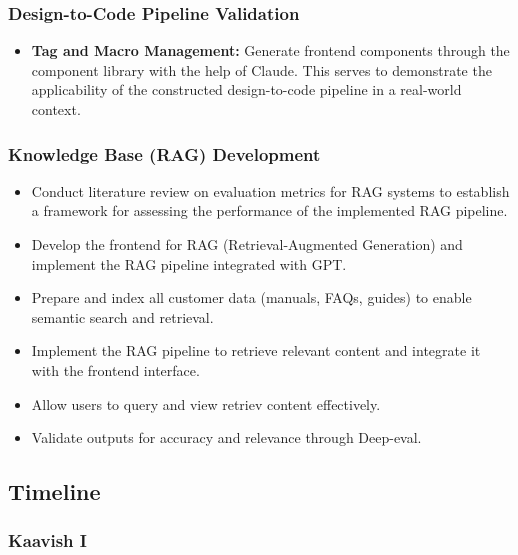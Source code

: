 \subsubsection{Design-to-Code Pipeline Validation}

\begin{itemize}
    \item \textbf{Tag and Macro Management:} Generate frontend components through the component library with the help of Claude. This serves to demonstrate the applicability of the constructed design-to-code pipeline in a real-world context.
\end{itemize}

\subsubsection{Knowledge Base (RAG) Development}

\begin{itemize}
\item Conduct literature review on evaluation metrics for RAG systems to establish a framework for assessing the performance of the implemented RAG pipeline.

\item Develop the frontend for RAG (Retrieval-Augmented Generation) and implement the RAG pipeline integrated with GPT.

\item Prepare and index all customer data (manuals, FAQs, guides) to enable semantic search and retrieval.

\item Implement the RAG pipeline to retrieve relevant content and integrate it with the frontend interface.

\item Allow users to query and view retriev content effectively.

\item Validate outputs for accuracy and relevance through Deep-eval.
\end{itemize}

\newpage

\subsection{Timeline}

\subsubsection{Kaavish I}

